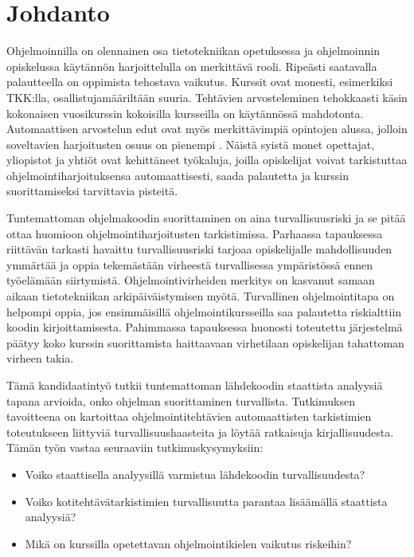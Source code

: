 

\section{Johdanto}
\label{sec:johd}

Ohjelmoinnilla on olennainen osa tietotekniikan opetuksessa ja ohjelmoinnin
opiskelussa käytännön harjoittelulla on merkittävä rooli. Ripeästi saatavalla
palautteella on oppimista tehostava vaikutus. Kurssit ovat monesti, esimerkiksi
TKK:lla, osallistujamääriltään suuria. Tehtävien arvosteleminen tehokkaasti
käsin kokonaisen vuosikurssin kokoisilla kursseilla on käytännössä mahdotonta.
Automaattisen arvostelun edut ovat myös merkittävimpiä opintojen alussa,
jolloin soveltavien harjoitusten osuus on pienempi \citep{carter2003shall}.
Näistä syistä monet opettajat, yliopistot ja yhtiöt ovat kehittäneet työkaluja,
joilla opiskelijat voivat tarkistuttaa ohjelmointiharjoituksensa automaattisesti,
saada palautetta ja kurssin suorittamiseksi tarvittavia pisteitä.

Tuntemattoman ohjelmakoodin suorittaminen on aina turvallisuusriski ja se
pitää ottaa huomioon ohjelmointiharjoitusten tarkistimissa. Parhaassa
tapauksessa riittävän tarkasti havaittu turvallisuusriski tarjoaa
opiskelijalle mahdollisuuden ymmärtää ja oppia tekemästään virheestä
turvallisessa ympäristössä ennen työelämään siirtymistä. Ohjelmointivirheiden
merkitys on kasvanut samaan aikaan tietotekniikan arkipäiväistymisen myötä.
Turvallinen ohjelmointitapa on helpompi oppia, jos ensimmäisillä
ohjelmointikursseilla saa palautetta riskialttiin koodin kirjoittamisesta.
Pahimmassa tapauksessa huonosti toteutettu järjestelmä päätyy koko kurssin
suorittamista haittaavaan virhetilaan opiskelijan tahattoman virheen takia.

Tämä kandidaatintyö tutkii tuntemattoman lähdekoodin staattista
analyysiä tapana arvioida, onko ohjelman suorittaminen turvallista.
Tutkimuksen tavoitteena on kartoittaa ohjelmointitehtävien automaattisten
tarkistimien toteutukseen liittyviä turvallisuushaasteita ja löytää
ratkaisuja kirjallisuudesta. Tämän työn vastaa seuraaviin tutkimuskysymyksiin:

\begin{itemize}
\item Voiko staattisella analyysillä varmistua lähdekoodin turvallisuudesta?
\item Voiko kotitehtävätarkistimien turvallisuutta parantaa lisäämällä staattista analyysiä?
\item Mikä on kurssilla opetettavan ohjelmointikielen vaikutus riskeihin?
\end{itemize}

